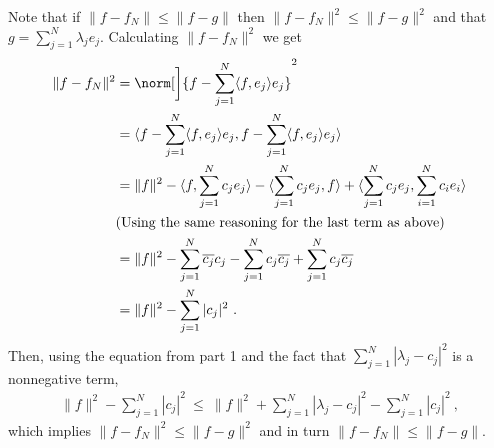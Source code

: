 \begin{questions}
\begin{solution}
\end{solution}
\newpage


\begin{solution}

Note that if $\|f - f_N\| \leq \|f - g\|$ then $\|f - f_N\|^2 \leq \|f - g\|^2$ and that $g = \sum_{j=1}^{N} \lambda_je_j$. Calculating $\|f - f_N\|^2$ we get
\begin{align*}
\|f - f_N\|^2 &= \norm[\bigg]{ f -  \sum_{j=1}^{N} \langle f,e_j \rangle e_j }^2 \\
& = \langle f -  \sum_{j=1}^{N} \langle f,e_j \rangle e_j,f -  \sum_{j=1}^{N} \langle f,e_j \rangle e_j \rangle \\
& = \|f\|^2 - \langle f, \sum_{j=1}^{N} c_je_j \rangle - \langle \sum_{j=1}^{N} c_je_j, f \rangle + \langle \sum_{j=1}^{N} c_je_j,\sum_{i=1}^{N} c_ie_i \rangle \\
& (\text{Using the same reasoning for the last term as above)} \\
& = \|f\|^2 - \sum_{j=1}^{N} \overline{ c_j}c_j - \sum_{j=1}^{N} c_j \overline{c_j} + \sum_{j=1}^{N} c_j\overline{c_j} \\
& = \|f\|^2 - \sum_{j=1}^{N} |c_j|^2~.
\end{align*}
Then, using the equation from part 1 and the fact that $\sum_{j=1}^{N} |  \lambda_j - c_j |^2$ is a nonnegative term,
\begin{align*}
\|f\|^2 - \sum_{j=1}^{N} |c_j|^2~ \leq~ \|f\|^2 + \sum_{j=1}^{N} |\lambda_j-c_j |^2 - \sum_{j=1}^{N} |c_j|^2~,
\end{align*}
which implies $\|f - f_N\|^2 \leq \|f - g\|^2$ and in turn $\|f - f_N\| \leq \|f - g\|$.
\end{solution}


\end{questions}